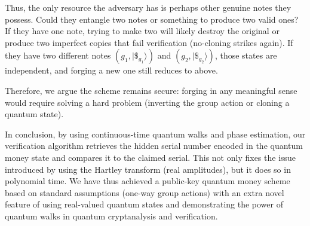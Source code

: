 \documentclass[11pt]{article}
\theoremstyle{definition}
\begin{document}
    Thus, the only resource the adversary has is perhaps other genuine notes they possess. Could they entangle two notes or something to produce two valid ones? If they have one note, trying to make two will likely destroy the original or produce two imperfect copies that fail verification (no-cloning strikes again). If they have two different notes $(g_1, |\$_{g_1}\rangle)$ and $(g_2, |\$_{g_2}\rangle)$, those states are independent, and forging a new one still reduces to above.

    Therefore, we argue the scheme remains secure: forging in any meaningful sense would require solving a hard problem (inverting the group action or cloning a quantum state).

    In conclusion, by using continuous-time quantum walks and phase estimation, our verification algorithm retrieves the hidden serial number encoded in the quantum money state and compares it to the claimed serial. This not only fixes the issue introduced by using the Hartley transform (real amplitudes), but it does so in polynomial time. We have thus achieved a public-key quantum money scheme based on standard assumptions (one-way group actions) with an extra novel feature of using real-valued quantum states and demonstrating the power of quantum walks in quantum cryptanalysis and verification.















\end{document}
